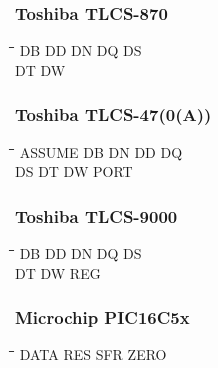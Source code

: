 \subsubsection{Toshiba TLCS-870}
{\tt\begin{tabbing}
\hspace{3cm}\=\hspace{3cm}\=\hspace{3cm}\=\hspace{3cm}\=\kill
DB         \> DD          \> DN         \> DQ          \> DS \\
DT         \> DW \\
\end{tabbing}}

\subsubsection{Toshiba TLCS-47(0(A))}
{\tt\begin{tabbing}
\hspace{3cm}\=\hspace{3cm}\=\hspace{3cm}\=\hspace{3cm}\=\kill
ASSUME     \> DB          \> DN         \> DD          \> DQ \\
DS         \> DT          \> DW         \> PORT \\
\end{tabbing}}

\subsubsection{Toshiba TLCS-9000}
{\tt\begin{tabbing}
\hspace{3cm}\=\hspace{3cm}\=\hspace{3cm}\=\hspace{3cm}\=\kill
DB         \> DD          \> DN         \> DQ          \> DS \\
DT         \> DW          \> REG \\
\end{tabbing}}

\subsubsection{Microchip PIC16C5x}
{\tt\begin{tabbing}
\hspace{3cm}\=\hspace{3cm}\=\hspace{3cm}\=\hspace{3cm}\=\kill
DATA       \> RES         \> SFR         \> ZERO \\
\end{tabbing}}

